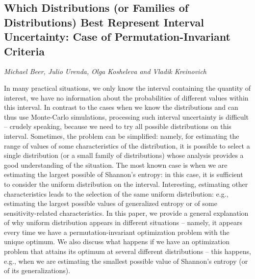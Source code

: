 \documentclass[../booklet.tex]{subfiles}
\begin{document}
\subsection[Which Distributions (or Families of Distributions) Best Represent Interval Uncertainty: Case of Permutation-Invariant Criteria. {\it Michael Beer, Julio Urenda, Olga Kosheleva and Vladik Kreinovich}]{Which Distributions (or Families of Distributions) Best Represent Interval Uncertainty: Case of Permutation-Invariant Criteria}
   

\begin{center}
  {\it Michael Beer, Julio Urenda, Olga Kosheleva and Vladik Kreinovich}
\end{center}

\vskip 0.8cm


In many practical situations, we only know the interval containing
the quantity of interest, we have no information about the
probabilities of different values within this interval. In contrast
to the cases when we know the distributions and can thus use
Monte-Carlo simulations, processing such interval uncertainty is
difficult -- crudely speaking, because we need to try all possible
distributions on this interval. Sometimes, the problem can be
simplified: namely, for estimating the range of values of some characteristics of the distribution,
it is possible to select a single distribution
(or a small family of distributions) whose analysis provides a good
understanding of the situation. The most known case is when we are estimating the largest possible of Shannon's entropy: in this case, it is sufficient to consider the uniform distribution on
the interval. Interesting, estimating other characteristics leads to the selection of the same
uniform distribution: e.g., estimating the largest possible values of generalized entropy or of some sensitivity-related characteristics. 
In this paper, we provide a general
explanation of why uniform distribution appears in different
situations -- namely, it appears every time we have a
permutation-invariant optimization problem with the unique optimum.
We also discuss what happens if we have an optimization problem that attains its optimum at several 
different distributions -- this happens, e.g., when we are estimating the smallest possible 
value of Shannon's entropy (or of its generalizations).
\end{document}
